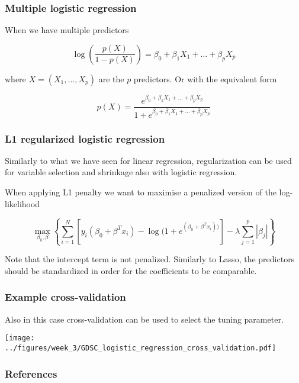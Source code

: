 \documentclass[notes]{beamer}          %
\begin{document}
\begin{frame}
\frametitle{Multiple logistic regression}

When we have multiple predictors

\begin{equation*}
    \log \left( \frac{p(X)}{1-p(X)} \right) = \beta_0 + \beta_1 X_1 + \dots + \beta_p X_p 
\end{equation*}

where $X=(X_1, \dots, X_p)$ are the $p$ predictors. Or with the equivalent form

\begin{equation*}
    p(X) = \frac{e^{\beta_0 + \beta_1 X_1 + \dots + \beta_p X_p}}{1+e^{\beta_0 + \beta_1 X_1 + \dots + \beta_p X_p}}
\end{equation*}


\end{frame}

\begin{frame}
\frametitle{L1 regularized logistic regression}

Similarly to what we have seen for linear regression, regularization can be used for variable selection and shrinkage also with logistic regression.

\vspace{5mm} 

When applying L1 penalty we want to maximise a penalized version of the log-likelihood

\begin{equation*}
    \max_{\beta_0, \beta} \left\{ \sum_{i=1}^N [ y_i(\beta_0 + \beta^T x_i) - \log (1+e^{(\beta_0 + \beta^T x_i))}] -\lambda \sum_{j=1}^p | \beta_j| \right\}
\end{equation*}

Note that the intercept term is not penalized. Similarly to Lasso, the predictors should be standardized in order for the coefficients to be comparable.

\end{frame}

\begin{frame}
\frametitle{Example cross-validation}

Also in this case cross-validation can be used to select the tuning parameter.

\begin{center}
\texttt{[image: ../figures/week\_3/GDSC\_logistic\_regression\_cross\_validation.pdf]}
\end{center}

\end{frame}


\begin{frame}
\frametitle{References}
\printbibliography
\end{frame}
\end{document}
